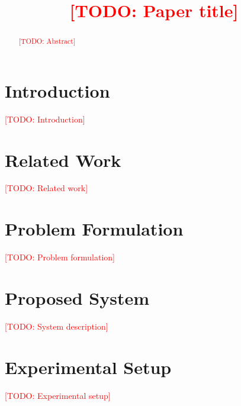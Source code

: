 \documentclass[conference]{IEEEtran}
\newcommand{\todo}[1]{\textcolor{red}{[TODO: #1]}}
\begin{document}
\title{\todo{Paper title}}
\author{
\IEEEauthorblockA{\todo{email}}
\and
{}
\and
{}
}
\maketitle

\begin{abstract}
\todo{Abstract}
\end{abstract}

\section{Introduction}
\todo{Introduction}

\section{Related Work}
\todo{Related work}

\section{Problem Formulation}
\todo{Problem formulation}

\section{Proposed System}
\todo{System description}

\section{Experimental Setup}
\begin{table}[t]\centering\caption{Evaluation repositories at their pinned commits}\label{tab:data}
\resizebox{\columnwidth}{!}{}\end{table}
\todo{Experimental setup}
\end{document}
